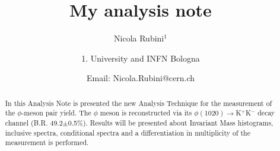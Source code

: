 \documentclass[ALICE,manyauthors]{ALICE_analysis_notes}
\begin{document}
%
%
%
\begin{titlepage}
%
\PHdate{\today}
%
\title{My analysis note}
%
\author{Nicola Rubini$^{1}$}
\author{
1. University and INFN Bologna\\
}
\author{Email: Nicola.Rubini@cern.ch}
%
%
\begin{abstract}
In this Analysis Note is presented the new Analysis Technique for the measurement of the $\phi$-meson pair yield. The $\phi$ meson is reconstructed via its $\phi(1020)\to$K$^{+}$K$^{-}$ decay channel (B.R. 49.2$\pm$0.5\%). Results will be presented about Invariant Mass histograms, inclusive spectra, conditional spectra and a differentiation in multiplicity of the measurement is performed.
\end{abstract}
\end{titlepage}
%
\tableofcontents
\newpage
%
%
\setcounter{secnumdepth}{0}

\setcounter{secnumdepth}{1}
\newpage

%
%
\end{document}
